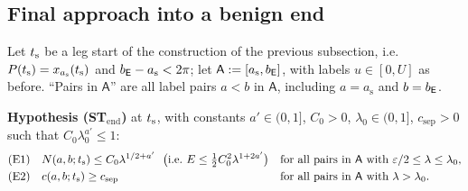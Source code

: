 \subsection{Final approach into a benign end}

Let $t_{\mathrm s}$ be a leg start of the construction of the previous subsection, i.e.\ $P(t_{\mathrm s})=x_{a_{\mathrm s}}(t_{\mathrm s})$ and
$b_{\mathsf E}-a_{\mathrm s}<2\pi$; let $\mathsf A:=[a_{\mathrm s},b_{\mathsf E}]$, with labels $u\in[0,U]$ as before. ``Pairs in $\mathsf A$'' are all
label pairs $a<b$ in $\mathsf A$, including $a=a_{\mathrm s}$ and $b=b_{\mathsf E}$.

\medskip\noindent\textbf{Hypothesis (ST$_{\mathrm{end}}$)} at $t_{\mathrm s}$, with constants $a'\in(0,1]$, $C_0>0$, $\lambda_0\in(0,1]$,
$c_{\mathrm{sep}}>0$ such that $C_0\lambda_0^{a'}\le1$:
\[
\begin{aligned}
&\textup{(E1)}\quad N(a,b;\Bts)\le C_0\lambda^{1/2+a'}\ \ \bigl(\text{i.e.\ }E\le\tfrac12C_0^2\lambda^{1+2a'}\bigr)
&&\text{for all pairs in $\mathsf A$ with }\varepsilon/2\le\lambda\le\lambda_0,\\
&\textup{(E2)}\quad c(a,b;\Bts)\ge c_{\mathrm{sep}}&&\text{for all pairs in $\mathsf A$ with }\lambda>\lambda_0 .
\end{aligned}
\]

